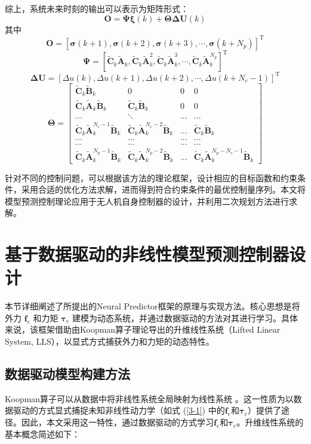 \documentclass[lang=chs, degree=master, blindreview=true, winfonts=true]{yanputhesis}
\begin{document}
综上，系统未来时刻的输出可以表示为矩阵形式：
\begin{equation}
    \bm O = \bm \Psi \bm \xi(k) + \bm \Theta \bm \Delta \bm U(k)
\end{equation}
其中$$
\boldsymbol{O} = 
\left[
	\boldsymbol{\sigma}(k+1) , \boldsymbol{\sigma}(k+2) , \boldsymbol{\sigma}(k+3) , \cdots , \boldsymbol{\sigma}(k+N_p)
\right]^\mathrm{T}$$
$$\boldsymbol{\Psi} = 
\left[
	\boldsymbol{\tilde{C}}_k\boldsymbol{\tilde{A}}_k , \boldsymbol{\tilde{C}}_k\boldsymbol{\tilde{A}}_k^2 , \boldsymbol{\tilde{C}}_k\boldsymbol{\tilde{A}}_k^3 , \cdots , \boldsymbol{\tilde{C}}_k\boldsymbol{\tilde{A}}_k^{N_p}
\right]^\mathrm{T}$$
$$\boldsymbol{\Delta U} = 
\left[
	\Delta u(k) , \Delta u(k+1) , \Delta u(k+2) , \cdots , \Delta u(k+N_c-1)
\right]^\mathrm{T}$$
$$\bm \Theta=\begin{bmatrix}\tilde{\bm C}_k\tilde{\bm B}_k&0&0&0\\\tilde{\bm C}_k\tilde{\bm A}_k\tilde{\bm B}_k&\tilde{\bm C}_k\tilde{\bm B}_k&0&0\\...&\ddots&...&...\\\tilde{\bm C}_k\tilde{\bm A}_k^{N_c-1}\tilde{\bm B}_k&\tilde{\bm C}_k\tilde{\bm A}_k^{N_c-2}\tilde{\bm B}_k&...&\tilde{\bm C}_k\tilde{\bm B}_k\\...&...&...&...\\...&...&...&...\\\tilde{\bm C}_k\tilde{\bm A}_k^{N_p-1}\tilde{\bm B}_k&\tilde{\bm C}_k\tilde{\bm A}_k^{N_p-2}\tilde{\bm B}_k&...&\tilde{\bm C}_k\tilde{\bm A}_k^{N_p-N_c-1}\tilde{\bm B}_k\end{bmatrix}$$

针对不同的控制问题，可以根据该方法的理论框架，设计相应的目标函数和约束条件，采用合适的优化方法求解，进而得到符合约束条件的最优控制量序列。本文将模型预测控制理论应用于无人机自身控制器的设计，并利用二次规划方法进行求解。

\section{基于数据驱动的非线性模型预测控制器设计}
本节详细阐述了所提出的Neural Predictor框架的原理与实现方法。核心思想是将外力 $\bm{f}_e$ 和力矩 $\bm{\tau}_e$ 建模为动态系统，并通过数据驱动的方法对其进行学习。具体来说，该框架借助由Koopman算子理论导出的升维线性系统（Lifted Linear System, LLS），以显式方式捕获外力和力矩的动态特性。

\subsection{数据驱动模型构建方法}
Koopman算子可以从数据中将非线性系统全局映射为线性系统 \cite{Mamakoukas2023}。这一性质为以数据驱动的方式显式捕捉未知非线性动力学（如式 (\ref{3-1}) 中的$\bm f_e$和$\bm \tau_e$）提供了途径。因此，本文采用这一特性，通过数据驱动的方式学习$\bm f_e$和$\bm \tau_e$。升维线性系统的基本概念简述如下：
\end{document}
